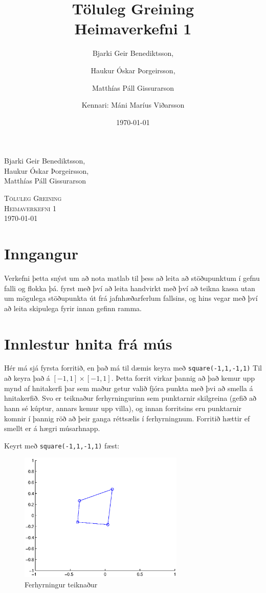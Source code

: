 \documentclass[a4]{article}
\title{Töluleg Greining\\ Heimaverkefni 1}
\date{\today{}}
\author{ 
  Bjarki Geir Benediktsson,\and
  Haukur Óskar Þorgeirsson,\and
  Matthías Páll Gissurarson \and
  Kennari: Máni Maríus Viðarsson
  }
\begin{document}
\begin{flushright}
  Bjarki Geir Benediktsson,\\
  Haukur Óskar Þorgeirsson,\\
  Matthías Páll Gissurarson\\
\end{flushright}

\begin{center}
 \textsc{ \LARGE Töluleg Greining\\
  Heimaverkefni 1\\
  \today{}
  }
  \end{center}
\vfill

\maketitle
\section*{Inngangur}

Verkefni þetta snýst um að nota matlab til þess að leita að stöðupunktum í gefnu falli og flokka þá. fyrst með því að leita handvirkt með því að teikna kassa utan um mögulega stöðupunkta út frá jafnhæðarferlum fallsins, og hins vegar með því að leita skipulega fyrir innan gefinn ramma.

\section{Innlestur hnita frá mús}

Hér má sjá fyrsta forritið, en það má til dæmis keyra með \lstinline{square(-1,1,-1,1)} Til að keyra það á $[-1,1] \times [-1,1]$. Þetta forrit virkar þannig að það kemur upp mynd af hnitakerfi þar sem maður getur valið fjóra punkta með þvi að smella á hnitakerfið. Svo er teiknaður ferhyrningurinn sem punktarnir skilgreina (gefið að hann sé kúptur, annars kemur upp villa), og innan forritsins eru punktarnir komnir í þannig röð að þeir ganga réttsælis í ferhyrningnum. Forritið hættir ef smellt er á hægri músarhnapp.



Keyrt með \lstinline{square(-1,1,-1,1)} fæst:

\begin{figure}[h!]
\centering
\includegraphics[width=0.7\textwidth]{squaredaemi.eps}
\caption{Ferhyrningur teiknaður}
\end{figure}
\end{document}
